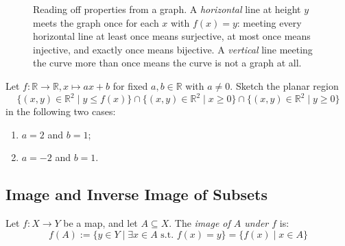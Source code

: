 \begin{figure}[ht!]
\caption{Reading off properties from a graph. A \textit{horizontal} line at height $y$ meets the graph once for each $x$ with $f(x) = y$: meeting every horizontal line at least once means surjective, at most once means injective, and exactly once means bijective. A \textit{vertical} line meeting the curve more than once means the curve is not a graph at all.}
\label{fig:graph_line_tests}
\end{figure}

\begin{exercise}
\label{exc:affine_map_planar_region}
Let $f \colon \mathbb{R} \to \mathbb{R}, x \mapsto ax + b$ for fixed $a, b \in \mathbb{R}$ with $a \ne 0$. Sketch the planar region
\[
\bigl\{ (x, y) \in \mathbb{R}^2 \mid y \le f(x) \bigr\} \cap \bigl\{ (x, y) \in \mathbb{R}^2 \mid x \ge 0 \bigr\} \cap \bigl\{ (x, y) \in \mathbb{R}^2 \mid y \ge 0 \bigr\}
\]
in the following two cases:
\begin{enumerate}
    \item $a = 2$ and $b = 1$;
    \item $a = -2$ and $b = 1$.
\end{enumerate}
\end{exercise}

\subsection{Image and Inverse Image of Subsets}

\begin{definition}
\label{def:image_of_subset}
Let $f: X \to Y$ be a map, and let $A \subseteq X$. The \textit{image of $A$ under $f$} is:
\[
f(A) := \{y \in Y \mid \exists x \in A \text{ s.t. } f(x) = y\} = \{f(x) \mid x \in A\}
\]
\end{definition}

